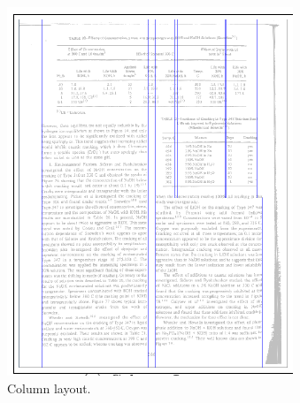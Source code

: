 \begin{figure}
\centering
\begin{subfigure}{0.30\textwidth}
\includegraphics[width=\linewidth]{img/tableDetection/tableDetectionColumns.pdf}
\caption{Column layout.}
\label{fig:tessTableDet1}
\end{subfigure}
\quad
\begin{subfigure}{0.30\textwidth}

\end{subfigure}
\end{figure}
